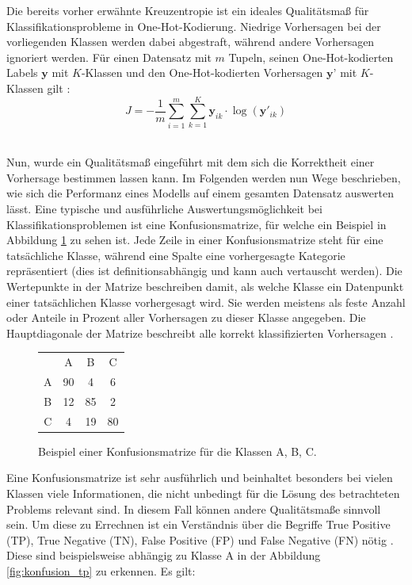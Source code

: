 \documentclass[11pt,bibliography=totocnumbered]{scrartcl}
\newcommand{\myequations}[1]{%
\addcontentsline{equ}{myequations}{\protect\numberline{\theequation}#1}}
\begin{document}
Die bereits vorher erwähnte Kreuzentropie ist ein ideales Qualitätsmaß für Klassifikationsprobleme in One-Hot-Kodierung. Niedrige Vorhersagen bei der vorliegenden Klassen werden dabei abgestraft, während andere Vorhersagen ignoriert werden. Für einen Datensatz mit \ensuremath{m} Tupeln, seinen One-Hot-kodierten Labels \ensuremath{\textbf{y}} mit \ensuremath{K}-Klassen und den One-Hot-kodierten Vorhersagen \ensuremath{\textbf{y'}} mit \ensuremath{K}-Klassen gilt \cite[S.13]{BA}\cite[S.63]{MACHINE_LEARNING}:
\begin{equation}
\label{eq:crossentropy}
J = -\frac{1}{m}\sum_{i=1}^{m}\sum_{k=1}^{K}\textbf{y}_{ik} \cdot \log({\textbf{y}'_{ik}})
\end{equation}\myequations{Kreuzentropie}
\\
Nun, wurde ein Qualitätsmaß eingeführt mit dem sich die Korrektheit einer Vorhersage bestimmen lassen kann. Im Folgenden werden nun Wege beschrieben, wie sich die Performanz eines Modells auf einem gesamten Datensatz auswerten lässt. Eine typische und ausführliche Auswertungsmöglichkeit bei Klassifikationsproblemen ist eine Konfusionsmatrize, für welche ein Beispiel in Abbildung \ref{fig:konfusion} zu sehen ist. Jede Zeile in einer Konfusionsmatrize steht für eine tatsächliche Klasse, während eine Spalte eine vorhergesagte Kategorie repräsentiert (dies ist definitionsabhängig und kann auch vertauscht werden). Die Wertepunkte in der Matrize beschreiben damit, als welche Klasse ein Datenpunkt einer tatsächlichen Klasse vorhergesagt wird. Sie werden meistens als feste Anzahl oder Anteile in Prozent aller Vorhersagen zu dieser Klasse angegeben. Die Hauptdiagonale der Matrize beschreibt alle korrekt klassifizierten Vorhersagen \cite[S.86-87]{MACHINE_LEARNING}.
\begin{figure}[H]
	\begin{center}
		\begin{tabular}{|c||c|c|c|}
			\hline
			 & A & B & C\\
			\hhline{|=||=|=|=|}
			A & 90 & 4 & 6\\
			\hline
			B & 12 & 85 & 2\\
			\hline	
			C & 4 & 19 & 80\\
			\hline
		\end{tabular}
	\end{center}
	\caption[Beispiel einer Konfusionsmatrize]{Beispiel einer Konfusionsmatrize für die Klassen A, B, C.}
	\label{fig:konfusion}
\end{figure}
Eine Konfusionsmatrize ist sehr ausführlich und beinhaltet besonders bei vielen Klassen viele Informationen, die nicht unbedingt für die Lösung des betrachteten Problems relevant sind. In diesem Fall können andere Qualitätsmaße sinnvoll sein. Um diese zu Errechnen ist ein Verständnis über die Begriffe True Positive (TP), True Negative (TN), False Positive (FP) und False Negative (FN) nötig \cite[S.87]{MACHINE_LEARNING}. Diese sind beispielsweise abhängig zu Klasse A in der Abbildung \ref{fig:konfusion_tp} zu erkennen. Es gilt:
\end{document}

